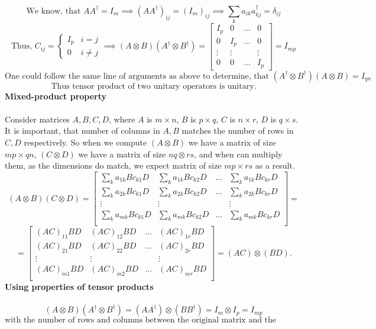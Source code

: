 \documentclass{article}
\begin{document}
\begin{framed}
\begin{equation}
    \end{equation}
    $$
    \text{We know, that } AA^{\dagger} = I_m \implies (AA^{\dagger})_{ij} = (I_m)_{ij} \implies \sum_{k}{a_{ik}a^{\dagger}_{kj}} = \delta_{ij}
    $$
    $$
    \text{Thus, } C_{ij} = \begin{cases}I_p & i = j \\0 & i \neq j\end{cases} \implies (A \otimes B)(A^{\dagger} \otimes B^{\dagger}) = \begin{bmatrix}
    I_p & 0 & \dots & 0\\
    0 & I_p & \dots & 0\\
    \vdots  & \vdots && \vdots\\
    0 & 0 &\dots &I_p
    \end{bmatrix} 
    = I_{mp}
    $$
    $$
    \text{One could follow the same line of arguments as above to determine, that } (A^{\dagger} \otimes B^{\dagger})(A \otimes B) = I_{qn}
    $$
    $$
    \text{Thus tensor product of two unitary operators is unitary.}
    $$
\textbf{Mixed-product property} \\\\
Consider matrices $A, B, C, D$, where $A$ is $m \times n$, $B$ is $p \times q$, $C$ is $n \times r$, $D$ is $q \times s$. It is important, that number of columns in $A,B$ matches the number of rows in $C,D$ respectively. So when we compute $(A \otimes B)$ we have a matrix of size $ mp \times qn$, $(C \otimes D)$ we have a matrix of size $nq \otimes rs$, and when can multiply them, as the dimensions do match, we expect matrix of size $mp \times rs$ as a result.
$$
(A\otimes B)(C \otimes D) = 
\begin{bmatrix}
 \sum_k{a_{1k}Bc_{k1}D} & \sum_k{a_{1k}Bc_{k2}D} & \dots & \sum_k{a_{1k}Bc_{kr}D} \\
 \sum_k{a_{2k}Bc_{k1}D} & \sum_k{a_{2k}Bc_{k2}D} & \dots & \sum_k{a_{2k}Bc_{kr}D} \\
 \vdots  & \vdots && \vdots\\
 \sum_k{a_{mk}Bc_{k1}D} & \sum_k{a_{mk}Bc_{k2}D} & \dots & \sum_k{a_{mk}Bc_{kr}D} \\
\end{bmatrix}
=
$$
$$
=
\begin{bmatrix}
(AC)_{11}BD & (AC)_{12}BD & \dots & (AC)_{1r}BD \\
 (AC)_{21}BD & (AC)_{22}BD & \dots & (AC)_{2r}BD \\
 \vdots  & \vdots && \vdots\\
 (AC)_{m1}BD & (AC)_{m2}BD & \dots & (AC)_{mr}BD \\
\end{bmatrix} = (AC) \otimes (BD).
$$
\textbf{Using properties of tensor products} \\\\
$$
(A \otimes B)(A^{\dagger} \otimes B^{\dagger}) = (AA^{\dagger}) \otimes(BB^{\dagger}) = I_m \otimes I_p = I_{mp}
$$
$$
\text{with the number of rows and columns between the original matrix and the transpose matching trivially.}
$$

\end{framed}
\end{document}
